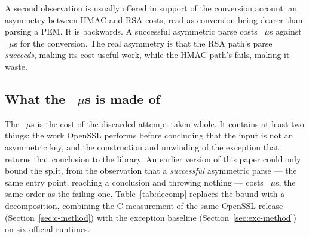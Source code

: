 \documentclass[pdflatex,sn-basic,twocolumn]{sn-jnl}%
\begin{document}
A second observation is usually offered in support of the conversion account: an
asymmetry between HMAC and RSA costs, read as conversion being dearer than
parsing a PEM. It is backwards. A successful asymmetric parse costs
\HostProbeSucceeds~$\mu$s against \HostCreateSecretKey~$\mu$s for the
conversion. The real asymmetry is that the RSA path's parse \emph{succeeds},
making its cost useful work, while the HMAC path's fails, making it waste.

\subsection{What the \texorpdfstring{\HostProbeThrows~$\mu$s}{18 us} is made
of}\label{sec:granularity}

The \HostProbeThrows~$\mu$s is the cost of the discarded attempt taken whole. It
contains at least two things: the work OpenSSL performs before concluding that
the input is not an asymmetric key, and the construction and unwinding of the
exception that returns that conclusion to the library. An earlier version of
this paper could only bound the split, from the observation that a
\emph{successful} asymmetric parse --- the same entry point, reaching a
conclusion and throwing nothing --- costs \HostProbeSucceeds~$\mu$s, the same
order as the failing one. Table~\ref{tab:decomp} replaces the bound with a
decomposition, combining the C measurement of the same OpenSSL release
(Section~\ref{sec:c-method}) with the exception baseline
(Section~\ref{sec:exc-method}) on six official runtimes.
\end{document}
